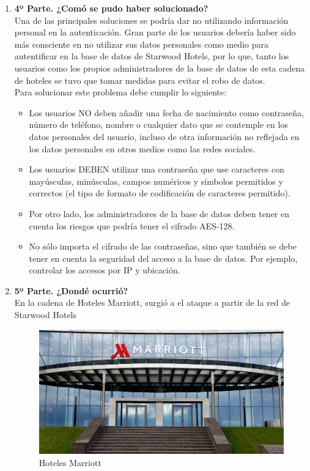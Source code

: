 \documentclass{article}
\begin{document}
\begin{enumerate}[label=\alph*]
    \item \textbf{4º Parte. ¿Comó se pudo haber solucionado?}\\
        Una de las principales soluciones se podría dar no utilizando
    información personal en la autenticación.
    Gran parte de los usuarios debería haber sido más consciente en no utilizar sus datos
    personales como medio para autentificar en la base de datos de Starwood Hotels,
    por lo que, tanto los usuarios como los propios administradores de la base de datos de
    esta cadena de hoteles se tuvo que tomar medidas para evitar el robo de datos. \\
    Para solucionar este problema debe cumplir lo siguiente:
    
    \begin{itemize}
        \item Los usuarios NO deben añadir una fecha de nacimiento como contraseña, número de teléfono,
              nombre o cualquier dato que se contemple en los datos personales del usuario,
              incluso de otra información no reflejada en los datos personales en otros medios
              como las redes sociales.
        \item Los usuarios DEBEN utilizar una contraseña que use caracteres con mayúsculas,
              minúsculas, campos numéricos y símbolos permitidos y correctos
              (el tipo de formato de codificación de caracteres permitido).
        \item Por otro lado, los administradores de la base de datos deben tener en cuenta los
              riesgos que podría tener el cifrado AES-128.
        \item No sólo importa el cifrado de las contraseñas, sino que también se debe tener en cuenta
              la seguridad del acceso a la base de datos. Por ejemplo, controlar los accesos por IP y ubicación.
    \end{itemize}

    \item \textbf{5º Parte. ¿Dondé ocurrió?} \\
        En la cadena de Hoteles Marriott, surgió a el ataque a partir de la red de Starwood Hotels
        \begin{figure}[H]
        \centering
        \includegraphics[width=0.7\linewidth]{./marriott}
        \caption{Hoteles Marriott}
        \end{figure}
\end{enumerate}
\end{document}
